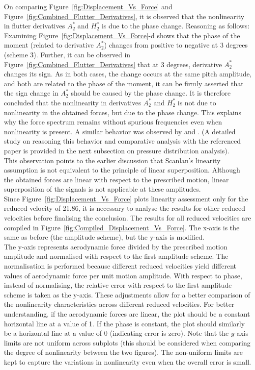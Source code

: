 \documentclass[../main]{subfiles}
\begin{document}
On comparing Figure~\ref{fig:Displacement_Vs_Force} and Figure~\ref{fig:Combined_Flutter_Derivatives}, 
it is observed that the nonlinearity in flutter derivatives $A_2^*$ and $H_2^*$ is due to the phase change. 
Reasoning as follows: Examining Figure~\ref{fig:Displacement_Vs_Force}-{d} shows that the phase of the moment (related to derivative $A_2^*$) changes 
from positive to negative at 3 degrees (scheme 3). Further, it can be observed in Figure~\ref{fig:Combined_Flutter_Derivatives} 
that at 3 degrees, derivative $A_2^*$ changes its sign. 
As in both cases, the change occurs at the same pitch amplitude, and both are related to the phase of the moment, 
it can be firmly asserted that the sign change in $A_2^*$ should be caused by the phase change. It is therefore concluded 
that the nonlinearity in derivatives $A_2^*$ and $H_2^*$ is not due to nonlinearity in the obtained forces, 
but due to the phase change. This explains why the force spectrum remains without spurious frequencies even when 
nonlinearity is present. A similar behavior was observed by \cite{noda2003} and \cite{lin2019}.
(A detailed study on reasoning this behavior and comparative analysis with the 
referenced paper is provided in the next subsection on pressure distribution analysis).\\ 

This observation points to the earlier discussion that Scanlan's linearity assumption is not equivalent to the principle of linear superposition. 
Although the obtained forces are linear with respect to the prescribed motion, linear superposition of the signals is not applicable at these amplitudes. \\

Since Figure~\ref{fig:Displacement_Vs_Force} plots linearity assessment only for the reduced velocity of 21.86, it is necessary to analyse the results for other reduced 
velocities before finalising the conclusion. The results for all reduced velocities are compiled in Figure~\ref{fig:Compiled_Displacement_Vs_Force}. 
The x-axis is the same as before (the amplitude scheme), but the y-axis is modified. \\

The y-axis represents aerodynamic force divided by the prescribed motion amplitude and normalised with respect to the first amplitude scheme. The normalisation 
is performed because different reduced velocities yield different values of aerodynamic force per unit motion amplitude. With respect 
to phase, instead of normalising, the relative error with respect to the first amplitude scheme is taken as the y-axis. These adjustments allow for a 
better comparison of the nonlinearity characteristics across different reduced velocities. For better understanding,  
if the aerodynamic forces are linear, the plot should be a constant horizontal line at a value of 1. If the phase is constant, 
the plot should similarly be a horizontal line at a value of 0 (indicating error is zero). Note that the $y$-axis limits are not uniform across subplots (this should be considered 
when comparing the degree of nonlinearity between the two figures). The non-uniform limits are 
kept to capture the variations in nonlinearity even when the overall error is small. \\
\end{document}
